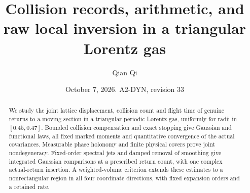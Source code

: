 \documentclass[11pt,reqno]{amsart}
\title[Collision records and raw local inversion]{Collision records, arithmetic, and raw local inversion in a triangular Lorentz gas}
\author{Qian Qi}
\date{October 7, 2026. A2-DYN, revision 33}
\numberwithin{equation}{section}
\theoremstyle{definition}\newtheorem{definition}[theorem]{Definition}
\theoremstyle{remark}\newtheorem{remark}[theorem]{Remark}
\begin{document}
\raggedbottom
\begin{abstract}
We study the joint lattice displacement, collision count and flight time
of genuine returns to a moving section in a triangular periodic Lorentz
gas, uniformly for radii in $[0.45,0.47]$. Bounded collision compensation
and exact stopping give Gaussian and functional laws, all fixed marked
moments and quantitative convergence of the actual covariances.
Measurable phase holonomy and finite physical covers prove joint
nondegeneracy. Fixed-order spectral jets and damped removal of smoothing
give integrated Gaussian comparisons at a prescribed return count,
with one complex actual-return insertion. A weighted-volume criterion
extends these estimates to a nonrectangular region in all four
coordinate directions, with fixed expansion orders and a retained rate.


\end{abstract}
\end{document}
